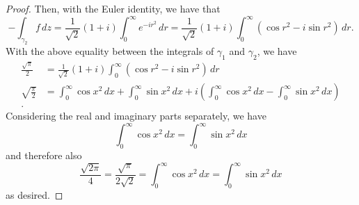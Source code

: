 \documentclass[../hw2]{subfiles}
\begin{document}
\begin{proof}
  Then, with the Euler identity, we have that \[
   -\int_{\gamma_2} f\,dz = \frac{1}{\sqrt{2}}(1+i)\int_{0}^{\infty} e^{-ir^2} \,dr = \frac{1}{\sqrt{2} }(1+i) \int_{0}^{\infty} (\cos{r^2}-i\sin{r^2}) \,dr
  .\] 
  With the above equality between the integrals of $\gamma_1$ and $\gamma_2$, we have 
  \begin{align*}
    \frac{\sqrt{\pi}}{2} &= \frac{1}{\sqrt{2} }(1+i) \int_{0}^{\infty} (\cos{r^2}-i\sin{r^2}) \,dr \\
   \sqrt{\frac{\pi}{2}}  &= \int_{0}^{\infty} \cos{x^2} \,dx + \int_{0}^{\infty} \sin{x^2}\,dx + i\left( \int_{0}^{\infty} \cos{x^2}\,dx - \int_{0}^{\infty} \sin{x^2} \,dx \right)  \\
  .\end{align*}
  Considering the real and imaginary parts separately, we have \[
 \int_{0}^{\infty} \cos{x^2}  \,dx  = \int_{0}^{\infty} \sin{x^2}  \,dx
  \] and therefore also \[
  \frac{\sqrt{2\pi}}{4}=\frac{\sqrt{\pi} }{2\sqrt{2} }=\int_{0}^{\infty} \cos{x^2} \,dx = \int_{0}^{\infty} \sin{x^2} \,dx
  \] as desired.
\end{proof}
\end{document}
